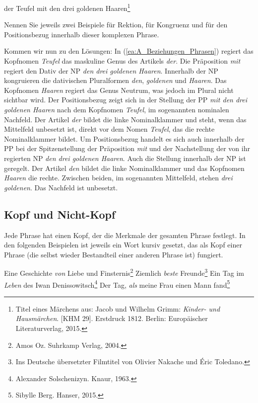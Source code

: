 \ea \label{ea:A_Beziehungen_Phrasen} der Teufel mit den drei goldenen Haaren\footnote{Titel eines Märchens aus: Jacob und Wilhelm Grimm: \textit{Kinder- und Hausmärchen}. [KHM 29]. Erstdruck 1812. Berlin: Europäischer Literaturverlag, 2015.}
\z 

Nennen Sie jeweils zwei Beispiele für Rektion, für Kongruenz und für den Positionsbezug innerhalb dieser komplexen Phrase.



Kommen wir nun zu den Lösungen: In (\ref{ea:A_Beziehungen_Phrasen}) regiert das Kopfnomen \textit{Teufel} das maskuline Genus des Artikels \textit{der}. Die Präposition \textit{mit} regiert den Dativ der NP \textit{den drei goldenen Haaren}. Innerhalb der NP kongruieren die dativischen Pluralformen \textit{den}, \textit{goldenen} und \textit{Haaren}. Das Kopfnomen \textit{Haaren} regiert das Genus Neutrum, was jedoch im Plural nicht sichtbar wird. Der Positionsbezug zeigt sich in der Stellung der PP \textit{mit den drei goldenen Haaren} nach dem Kopfnomen \textit{Teufel}, im sogenannten nominalen Nachfeld. Der Artikel \textit{der} bildet die linke Nominalklammer und steht, wenn das Mittelfeld unbesetzt ist, direkt vor dem Nomen \textit{Teufel}, das die rechte Nominalklammer bildet. Um Positionsbezug handelt es sich auch innerhalb der PP bei der Spitzenstellung der Präposition \textit{mit} und der Nachstellung der von ihr regierten NP \textit{den drei goldenen Haaren}. Auch die Stellung innerhalb der NP ist geregelt. Der Artikel \textit{den} bildet die linke Nominalklammer und das Kopfnomen \textit{Haaren} die rechte. Zwischen beiden, im sogenannten Mittelfeld, stehen \textit{drei goldenen}. Das Nachfeld ist unbesetzt.  
 

\subsection{Kopf und Nicht-Kopf}\label{subsection:A_Nicht_Kopf_Phrasen}

Jede Phrase hat einen Kopf, der die Merkmale der gesamten Phrase festlegt. In den folgenden Beispielen ist jeweils ein Wort kursiv gesetzt, das als Kopf einer Phrase (die selbst wieder Bestandteil einer anderen Phrase ist) fungiert.

\ea \label{ea:A_Phrasen_Kopf}
\ea \label{ea:A_Kopf1} Eine Geschichte \textit{von} Liebe und Finsternis\footnote{Amos Oz. Suhrkamp Verlag, 2004.}  
\ex \label{ex:A_Kopf2} Ziemlich \textit{beste} Freunde\footnote{Ins Deutsche übersetzter Filmtitel von Olivier Nakache und Éric Toledano.}
\ex \label{ex:A_Kopf3} Ein Tag im \textit{Leben} des Iwan Denissowitsch\footnote{Alexander Solschenizyn. Knaur, 1963.}
\ex \label{ex:A_Kopf4} Der Tag, \textit{als} meine Frau einen Mann fand\footnote{Sibylle Berg. Hanser, 2015.}
\z 
\z 


